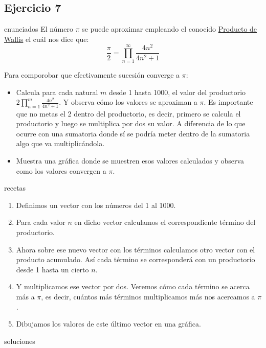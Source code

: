 \subsection{Ejercicio 7}
\def\parte{enunciados}
\ifx\capitulo\parte
El número $\pi$ se puede aproximar empleando el conocido \href{https://en.wikipedia.org/wiki/Wallis_product}{Producto de Wallis} el cuál nos dice que:
\[\frac{\pi}{2} = \prod_{n = 1}^{\infty} \frac{4n^2}{4n^2 + 1}\]

Para comporobar que efectivamente sucesión converge a $\pi$:
\begin{itemize}
\item Calcula para cada natural $m$ desde 1 hasta 1000, el valor del productorio $2\prod_{n = 1}^{m} \frac{4n^2}{4n^2 + 1}$. Y observa cómo los valores se aproximan a $\pi$. Es importante que no metas el 2 dentro del productorio, es decir, primero se calcula el productorio y luego se multiplica por dos su valor. A diferencia de lo que ocurre con una sumatoria donde sí se podría meter dentro de la sumatoria algo que va multiplicándola.
\item Muestra una gráfica donde se muestren esos valores calculados y observa como los valores convergen a $\pi$.
\end{itemize}
\fi

\def\parte{recetas}
\ifx\capitulo\parte
\begin{enumerate}
\item Definimos un vector con los números del 1 al 1000.
\item Para cada valor $n$ en dicho vector calculamos el correspondiente término del productorio.
\item Ahora sobre ese nuevo vector con los términos calculamos otro vector con el producto acumulado. Así cada término se corresponderá con un productorio desde 1 hasta un cierto $n$.
\item Y multiplicamos ese vector por dos. Veremos cómo cada término se acerca más a $\pi$, es decir, cuántos más términos multiplicamos más nos acercamos a $\pi$.
\item Dibujamos los valores de este último vector en una gráfica.
\end{enumerate}
\fi

\def\parte{soluciones}
\ifx\capitulo\parte

\fi
